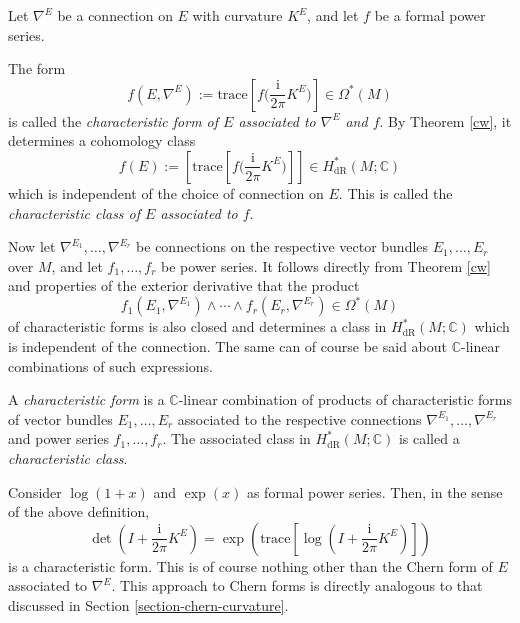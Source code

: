 \documentclass[a4paper,openany]{scrbook}
\newcommand{\ui}{\mathrm{i}}
\begin{document}
Let $\nabla^E$ be a connection on $E$ with curvature $K^E$, and let $f$ be a formal power series.

\begin{defn}
The form
\begin{equation*}
f(E,\nabla^E):=\text{trace}\left[f\Big(\frac{\ui}{2\pi}K^E\Big)\right]\in\Omega^*(M)
\end{equation*}
is called the \emph{characteristic form of $E$ associated to $\nabla^E$ and $f$}. By Theorem \ref{cw}, it determines a cohomology class 
\begin{equation*}
f(E):=\left[\text{trace}\left[f\Big(\frac{\ui}{2\pi}K^E\Big)\right]\right]\in H_\text{dR}^*(M;\mathbb{C})
\end{equation*}
which is independent of the choice of connection on $E$. This is called the \emph{characteristic class of $E$ associated to $f$}. 
\end{defn}

Now let $\nabla^{E_1},\dots,\nabla^{E_r}$ be connections on the respective vector bundles $E_1,\dots,E_r$ over $M$, and let $f_1,\dots,f_r$ be power series. It follows directly from Theorem \ref{cw} and properties of the exterior derivative that the product
\begin{equation*}
f_1(E_1,\nabla^{E_1})\wedge\cdots\wedge f_r(E_r,\nabla^{E_r})\in\Omega^*(M)
\end{equation*}
of characteristic forms is also closed and determines a class in $H_\text{dR}^*(M;\mathbb{C})$ which is independent of the connection. The same can of course be said about $\mathbb{C}$-linear combinations of such expressions.

\begin{defn}
A \emph{characteristic form} is a $\mathbb{C}$-linear combination of products of characteristic forms of vector bundles $E_1,\dots,E_r$ associated to the respective connections $\nabla^{E_1},\dots,\nabla^{E_r}$ and power series $f_1,\dots,f_r$. The associated class in $H_\text{dR}^*(M;\mathbb{C})$ is called a \emph{characteristic class}.
\end{defn}

\begin{example}
Consider $\log(1+x)$ and $\exp(x)$ as formal power series. Then, in the sense of the above definition,
\begin{equation}\label{cwchern0}
\det\left(I+\frac{\ui}{2\pi}K^E\right)=\exp\left(\text{trace}\left[\log\left(I+\frac{\ui}{2\pi}K^E\right)\right]\right)
\end{equation}
is a characteristic form. This is of course nothing other than the Chern form of $E$ associated to $\nabla^E$. This approach to Chern forms is directly analogous to that discussed in Section \ref{section-chern-curvature}.
\end{example}
\end{document}
